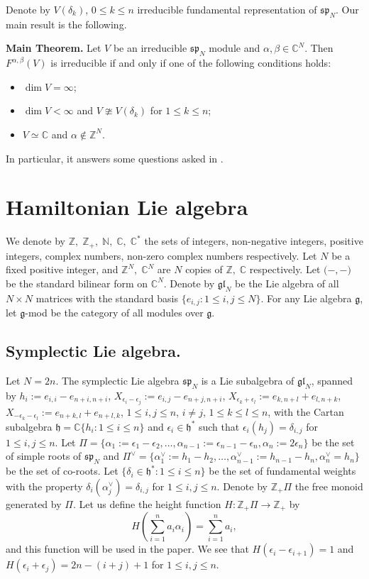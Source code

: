 \documentclass[a4paper,11pt]{amsart}
\numberwithin{equation}{section}
\theoremstyle{plain}
\newcommand{\N}{\mathbb{N}}
\newcommand{\Z}{\mathbb{Z}}
\newcommand{\C}{\mathbb{C}}
\newcommand{\g}{\mathfrak{g}}
\newcommand{\gl}{\mathfrak{gl}}
\newcommand{\h}{\mathfrak{h}}
\newcommand{\s}{\mathfrak{sp}_{N}}
\begin{document}
Denote by $V(\delta_k)$, $0\leq k \leq n$ irreducible fundamental representation of 
$\s$. Our main result is the following.
  
\medskip

 {\bf Main Theorem.}
    Let $V$ be an irreducible $\s$ module and $\alpha,\beta \in \C^N$. Then $F^{\alpha,\beta}(V)$ is irreducible if and only if one of the following conditions holds:
    \begin{itemize}
    \item[(i)] $\dim V=\infty$;
    \item[(ii)] $\dim V < \infty$ and 
    $V\ncong V(\delta_k)$ for $1\leq k\leq n$;
    \item[(iii)]  $V\simeq \C$ and $\alpha\notin \Z^N$.
\end{itemize}

In particular, it answers some questions asked in  \cite[Remark 4.11]{PSTZ23}.

   
\section{Hamiltonian Lie algebra}	
 We denote by $\Z,\; \Z_+,\; \N,\; \C,\; \C^*$ the sets of integers, non-negative integers, positive integers, complex numbers, non-zero complex numbers respectively.  Let $N$ be a fixed positive integer, and $\Z^N,\;\C^N$ are $N$ copies of $\Z,\;\C$ respectively. Let $\bm{(}-,-\bm{)}$ be the standard bilinear form on $\C^N$. Denote by $\gl_N$ be the Lie algebra of all $N\times N$ matrices with the standard basis $\{e_{i,j}:1\leq i,j\leq N\}$. For any Lie algebra $\g$, let $\g$-mod be the category of all modules over $\g$.  

 
 \subsection{Symplectic Lie algebra.}
  Let $N=2n$. The symplectic Lie algebra $\s$ is a Lie subalgebra of $\gl_N$, spanned by $h_i:=e_{i,i}-e_{n+i,n+i}$, $X_{\epsilon_i-\epsilon_j}:=e_{i,j}-e_{n+j,n+i}$,  $X_{\epsilon_k+\epsilon_{l}}:=e_{k,n+l}+e_{l,n+k}$, $X_{-\epsilon_k-\epsilon_l}:=e_{n+k,l}+e_{n+l,k}$, $1\leq i,j\leq n$, $i\neq j$, $1\leq k\leq  l\leq n$, with the Cartan subalgebra $\h=\C\{h_i:1\leq i\leq n\}$ and $\epsilon_i\in \h^*$ such that $\epsilon_i(h_j)=\delta_{i,j}$ for $1\leq i,j\leq n$. Let $\Pi=\{\alpha_1:=\epsilon_1-\epsilon_2, \dots, \alpha_{n-1}:=\epsilon_{n-1}-\epsilon_{n}, \alpha_n:=2\epsilon_n\}$ be the set of simple roots of $\s$ and $\Pi^\vee=\{\alpha_1^{\vee}:=h_1-h_2,\dots, \alpha_{n-1}^\vee:= h_{n-1}-h_{n}, \alpha_n^{\vee}=h_n\}$ be the set of co-roots. Let $\{\delta_i\in \h^*:1\leq i\leq n\}$ be the set of fundamental weights with the property $\delta_i(\alpha_j^\vee)=\delta_{i,j}$ for $1\leq i,j\leq n$. Denote by $\Z_{+} \Pi$ the free monoid generated by $\Pi$.
 Let us define the height function $H:\Z_{+} \Pi \rightarrow \Z_{+}$ by $$H(\sum_{i=1}^na_i\alpha_i)=\sum_{i=1}^na_i,$$ and this function will be used in the paper. We see that $H(\epsilon_{i}-\epsilon_{i+1})=1$ and $H(\epsilon_i+\epsilon_j)=2n-(i+j)+1$ for $1\leq i,j\leq n$.
   
\end{document}
